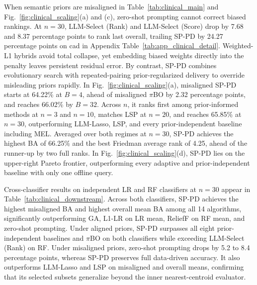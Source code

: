 When semantic priors are misaligned in Table~\ref{tab:clinical_main} and Fig.~\ref{fig:clinical_scaling}(a) and (c), zero-shot prompting cannot correct biased rankings. At $n = 30$, LLM-Select (Rank) and LLM-Select (Score) drop by 7.68 and 8.37 percentage points to rank last overall, trailing SP-PD by 24.27 percentage points on cad in Appendix Table~\ref{tab:app_clinical_detail}. Weighted-L1 hybrids avoid total collapse, yet embedding biased weights directly into the penalty leaves persistent residual error. By contrast, SP-PD combines evolutionary search with repeated-pairing prior-regularized delivery to override misleading priors rapidly. In Fig.~\ref{fig:clinical_scaling}(a), misaligned SP-PD starts at 64.22\% at $B = 4$, ahead of misaligned $\pi$BO by 2.32 percentage points, and reaches 66.02\% by $B = 32$. Across $n$, it ranks first among prior-informed methods at $n = 3$ and $n = 10$, matches LSP at $n = 20$, and reaches 65.85\% at $n = 30$, outperforming LLM-Lasso, LSP, and every prior-independent baseline including MEL. Averaged over both regimes at $n = 30$, SP-PD achieves the highest BA of 66.25\% and the best Friedman average rank of 4.25, ahead of the runner-up by two full ranks. In Fig.~\ref{fig:clinical_scaling}(d), SP-PD lies on the upper-right Pareto frontier, outperforming every adaptive and prior-independent baseline with only one offline query.


Cross-classifier results on independent LR and RF classifiers at $n = 30$ appear in Table~\ref{tab:clinical_downstream}. Across both classifiers, SP-PD achieves the highest misaligned BA and highest overall mean BA among all 14 algorithms, significantly outperforming GA, L1-LR on LR mean, ReliefF on RF mean, and zero-shot prompting. Under aligned priors, SP-PD surpasses all eight prior-independent baselines and $\pi$BO on both classifiers while exceeding LLM-Select (Rank) on RF. Under misaligned priors, zero-shot prompting drops by 5.2 to 8.4 percentage points, whereas SP-PD preserves full data-driven accuracy. It also outperforms LLM-Lasso and LSP on misaligned and overall means, confirming that its selected subsets generalize beyond the inner nearest-centroid evaluator.
